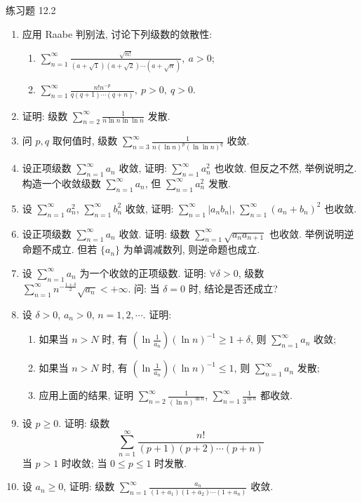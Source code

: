\begin{exblock}{练习题 12.2}
\begin{enumerate}
  \item 应用 Raabe 判别法, 讨论下列级数的敛散性:
  \begin{enumerate}
    \item $\displaystyle\sum_{n=1}^{\infty}\frac{\sqrt{n!}}{(a+\sqrt{1})(a+\sqrt{2})\cdots(a+\sqrt{n})},\ a>0$;
    \item $\displaystyle\sum_{n=1}^{\infty}\frac{n!n^{-p}}{q(q+1)\cdots(q+n)},\ p>0,\ q>0$.
  \end{enumerate}
  \item 证明: 级数 $\sum_{n=2}^{\infty}\frac{1}{n\ln n\ln\ln n}$ 发散.
  \item 问 $p,q$ 取何值时, 级数 $\sum_{n=3}^{\infty}\frac{1}{n(\ln n)^{p}(\ln\ln n)^{q}}$ 收敛.
  \item 设正项级数 $\sum_{n=1}^{\infty}a_{n}$ 收敛, 证明: $\sum_{n=1}^{\infty}a_{n}^{2}$ 也收敛. 但反之不然, 举例说明之. 构造一个收敛级数 $\sum_{n=1}^{\infty}a_{n}$, 但 $\sum_{n=1}^{\infty}a_{n}^{2}$ 发散.
  \item 设 $\sum_{n=1}^{\infty}a_{n}^{2}$, $\sum_{n=1}^{\infty}b_{n}^{2}$ 收敛, 证明: $\sum_{n=1}^{\infty}\left|a_{n}b_{n}\right|$, $\sum_{n=1}^{\infty}(a_{n}+b_{n})^{2}$ 也收敛.
  \item 设正项级数 $\sum_{n=1}^{\infty}a_{n}$ 收敛. 证明: 级数 $\sum_{n=1}^{\infty}\sqrt{a_{n}a_{n+1}}$ 也收敛. 举例说明逆命题不成立. 但若 $\{a_{n}\}$ 为单调减数列, 则逆命题也成立.
  \item 设 $\sum_{n=1}^{\infty}a_{n}$ 为一个收敛的正项级数. 证明: $\forall\delta>0$, 级数 $\sum_{n=1}^{\infty}n^{-\frac{1+\delta}{2}}\sqrt{a_{n}}<+\infty$. 问: 当 $\delta=0$ 时, 结论是否还成立?
  \item 设 $\delta>0$, $a_{n}>0$, $n=1,2,\cdots$. 证明:
  \begin{enumerate}
    \item[(1)] 如果当 $n>N$ 时, 有 $\left(\ln\frac{1}{a_{n}}\right)(\ln n)^{-1}\geqslant1+\delta$, 则 $\sum_{n=1}^{\infty}a_{n}$ 收敛;
    \item[(2)] 如果当 $n>N$ 时, 有 $\left(\ln\frac{1}{a_{n}}\right)(\ln n)^{-1}\leqslant1$, 则 $\sum_{n=1}^{\infty}a_{n}$ 发散;
    \item[(3)] 应用上面的结果, 证明 $\sum_{n=2}^{\infty}\frac{1}{(\ln n)^{\ln n}}$, $\sum_{n=1}^{\infty}\frac{1}{3^{\ln n}}$ 都收敛.
  \end{enumerate}
  \item 设 $p\geqslant0$. 证明: 级数
  \[
    \sum_{n=1}^{\infty}\frac{n!}{(p+1)(p+2)\cdots(p+n)}
\]
  当 $p>1$ 时收敛; 当 $0\leqslant p\leqslant1$ 时发散.
  \item 设 $a_{n}\geqslant0$, 证明: 级数 $\sum_{n=1}^{\infty}\frac{a_{n}}{(1+a_{1})(1+a_{2})\cdots(1+a_{n})}$ 收敛.

\end{enumerate}
\end{exblock}
